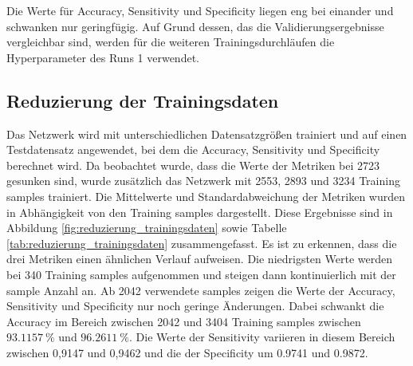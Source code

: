 Die Werte für Accuracy, Sensitivity und Specificity liegen eng bei einander und schwanken nur geringfügig.
Auf Grund dessen, das die Validierungsergebnisse vergleichbar sind, werden für die weiteren Trainingsdurchläufen die Hyperparameter des Runs 1 verwendet. 

\subsection{Reduzierung der Trainingsdaten}
Das Netzwerk wird mit unterschiedlichen Datensatzgrößen trainiert und auf einen Testdatensatz angewendet, bei dem die Accuracy, Sensitivity und Specificity berechnet wird.
Da beobachtet wurde, dass die Werte der Metriken bei 2723 gesunken sind, wurde zusätzlich das Netzwerk mit 2553, 2893 und 3234 
Training samples trainiert.
Die Mittelwerte und Standardabweichung der Metriken wurden in Abhängigkeit von den Training samples dargestellt.
Diese Ergebnisse sind in Abbildung \ref{fig:reduzierung_trainingsdaten} sowie Tabelle \ref{tab:reduzierung_trainingsdaten} zusammengefasst.
Es ist zu erkennen, dass die drei Metriken einen ähnlichen Verlauf aufweisen.
Die niedrigsten Werte werden bei 340 Training samples aufgenommen und steigen dann kontinuierlich mit der sample Anzahl an.
Ab 2042 verwendete samples zeigen die Werte der Accuracy, Sensitivity und Specificity nur noch geringe Änderungen.
Dabei schwankt die Accuracy im Bereich zwischen 2042 und 3404 Training samples zwischen $\qty{93.1157}{\%}$ und $\qty{96.2611}{\%}$. 
Die Werte der Sensitivity variieren in diesem Bereich zwischen 0,9147 und 0,9462 und die der Specificity um \SI{0,9741}{} und \SI{0,9872}{}.
